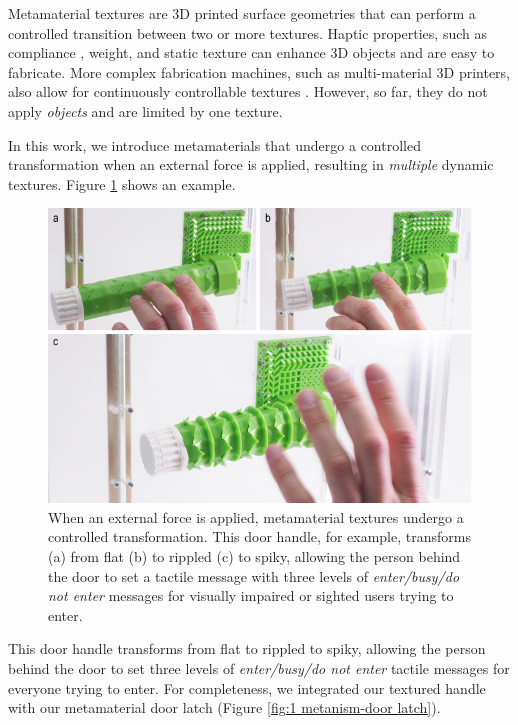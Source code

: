 Metamaterial textures are 3D printed surface geometries that can perform a controlled transition between two or more textures. Haptic properties, such as compliance \cite{Schumacher2015}, weight, and static texture can enhance 3D objects and are easy to fabricate. More complex fabrication machines, such as multi-material 3D printers, also allow for continuously controllable textures \cite{Guttag2015}. However, so far, they do not apply \textit{objects} and are limited by one texture. 

In this work, we introduce metamaterials that undergo a controlled transformation when an external force is applied, resulting in \textit{multiple} dynamic textures. Figure \ref{fig:1-door-handle-ridges-spiky} shows an example. 

\begin{figure} [h]
    \centering
    \includegraphics[width=\textwidth]{chapters/introduction-FIG/4-overview-textures.pdf}
    \caption[Short figure name.]{When an external force is applied, metamaterial textures undergo a controlled transformation. This door handle, for example, transforms (a) from flat (b) to rippled (c) to spiky, allowing the person behind the door to set a tactile message with three levels of \textit{enter/busy/do not enter} messages for visually impaired or sighted users trying to enter.
    \label{fig:1-door-handle-ridges-spiky}}
\end{figure}

This door handle transforms from flat to rippled to spiky, allowing the person behind the door to set three levels of \textit{enter/busy/do not enter} tactile messages for everyone trying to enter. For completeness, we integrated our textured handle with our metamaterial door latch (Figure \ref{fig:1 metanism-door latch}).


